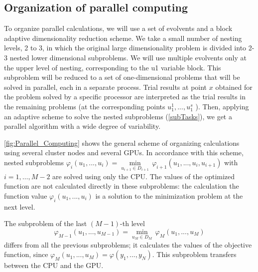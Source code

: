 \documentclass{svproc}
\begin{document}
\subsection{Organization of parallel computing}

To organize parallel calculations, we will use a set of evolvents and a block adaptive dimensionality reduction scheme. We take a small number of nesting levels, 2 to 3, in which the original large dimensionality problem is divided into 2-3 nested lower dimensional subproblems. We will use multiple evolvents only at the upper level of nesting, corresponding to the u1 variable block. This subproblem will be reduced to a set of one-dimensional problems that will be solved in parallel, each in a separate process. Trial results at point $x$ obtained for the problem solved by a specific processor are interpreted as the trial results in the remaining problems (at the corresponding points \(u^1_1,..., u^s_1\) ).
Then, applying an adaptive scheme to solve the nested subproblems (\ref{subTasks}), we get a parallel algorithm with a wide degree of variability.

\ref{fig:Parallel_Computing} shows the general scheme of organizing calculations using several cluster nodes and several GPUs. In accordance with this scheme, nested subproblems  ${{\varphi }_{i}}({{u}_{1}},...,{{u}_{i}})=\underset{{{u}_{i+1}}\in {{D}_{i+1}}}{\mathop{\min }}\,{{\varphi }_{i+1}}({{u}_{1}},...,{{u}_{i}},{{u}_{i+1}})$  with \(i=1,\ldots ,M-2\) are solved using only the CPU. The values of the optimized function are not calculated directly in these subproblems: the calculation the function value  ${{\varphi }_{i}}({{u}_{1}},...,{{u}_{i}})$ is a solution to the minimization problem at the next level.

The subproblem of the last \((M - 1)\)-th level 
\[
{{\varphi }_{M-1}}({{u}_{1}},...,{{u}_{M-1}})=\underset{{{u}_{M}}\in {{D}_{M}}}{\mathop{\min }}\,{{\varphi }_{M}}({{u}_{1}},...,{{u}_{M}})
\]
 differs from all the previous subproblems; it calculates the values of the objective function, since ${{\varphi }_{M}}({{u}_{1}},...,{{u}_{M}})=\varphi ({{y}_{1}},...,{{y}_{N}})$. This subproblem transfers between the CPU and the GPU.
\end{document}
